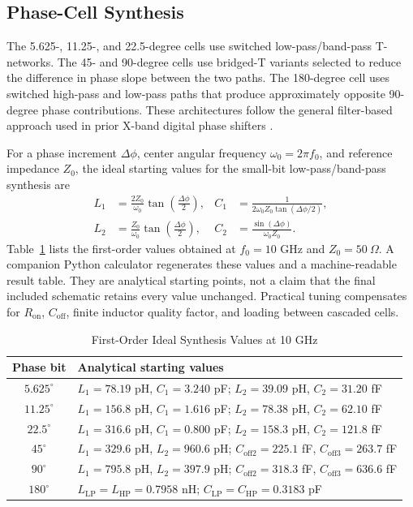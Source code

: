 \documentclass[conference]{IEEEtran}
\begin{document}
\subsection{Phase-Cell Synthesis}

The 5.625-, 11.25-, and 22.5-degree cells use switched low-pass/band-pass
T-networks. The 45- and 90-degree cells use bridged-T variants selected to
reduce the difference in phase slope between the two paths. The 180-degree
cell uses switched high-pass and low-pass paths that produce approximately
opposite 90-degree phase contributions. These architectures follow the
general filter-based approach used in prior X-band digital phase shifters
\cite{wang2015,xiong2017}.

For a phase increment $\Delta\phi$, center angular frequency
$\omega_0=2\pi f_0$, and reference impedance $Z_0$, the ideal starting values
for the small-bit low-pass/band-pass synthesis are
\begin{equation}
\begin{aligned}
 L_1 &= \frac{2Z_0}{\omega_0}\tan\left(\frac{\Delta\phi}{2}\right),&
 C_1 &= \frac{1}{2\omega_0Z_0\tan(\Delta\phi/2)},\\
 L_2 &= \frac{Z_0}{\omega_0}\tan\left(\frac{\Delta\phi}{2}\right),&
 C_2 &= \frac{\sin(\Delta\phi)}{\omega_0Z_0}.
\end{aligned}
\label{eq:small_bit_synthesis}
\end{equation}
Table~\ref{tab:start_values} lists the first-order values obtained at
$f_0=10$ GHz and $Z_0=50~\Omega$. A companion Python calculator regenerates
these values and a machine-readable result table. They are analytical starting
points, not a claim that the final included schematic retains every value
unchanged. Practical tuning compensates for $R_{\mathrm{on}}$,
$C_{\mathrm{off}}$, finite inductor quality factor, and loading between
cascaded cells.

\begin{table}[!t]
\caption{First-Order Ideal Synthesis Values at 10 GHz}
\label{tab:start_values}
\centering
\scriptsize
\setlength{\tabcolsep}{2.0pt}
\begin{tabular}{@{}cl@{}}
\toprule
Phase bit & Analytical starting values\\
\midrule
$5.625^\circ$ &
$L_1=78.19$ pH, $C_1=3.240$ pF; $L_2=39.09$ pH, $C_2=31.20$ fF\\
$11.25^\circ$ &
$L_1=156.8$ pH, $C_1=1.616$ pF; $L_2=78.38$ pH, $C_2=62.10$ fF\\
$22.5^\circ$ &
$L_1=316.6$ pH, $C_1=0.800$ pF; $L_2=158.3$ pH, $C_2=121.8$ fF\\
$45^\circ$ &
$L_1=329.6$ pH, $L_2=960.6$ pH; $C_{\mathrm{off2}}=225.1$ fF,
$C_{\mathrm{off3}}=263.7$ fF\\
$90^\circ$ &
$L_1=795.8$ pH, $L_2=397.9$ pH; $C_{\mathrm{off2}}=318.3$ fF,
$C_{\mathrm{off3}}=636.6$ fF\\
$180^\circ$ &
$L_{\mathrm{LP}}=L_{\mathrm{HP}}=0.7958$ nH;
$C_{\mathrm{LP}}=C_{\mathrm{HP}}=0.3183$ pF\\
\bottomrule
\end{tabular}
\end{table}
\end{document}
